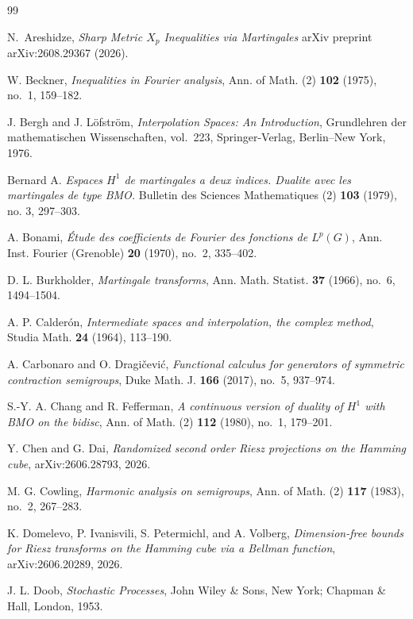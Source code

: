 \documentclass{amsart}
\numberwithin{equation}{section}
\theoremstyle{definition}
\theoremstyle{remark}
\newcommand{\1}{\mathbf 1}
\begin{document}
\begin{thebibliography}{99}

N.~Areshidze, \emph{Sharp Metric $ X_p $ Inequalities via Martingales} arXiv preprint arXiv:2608.29367 (2026).

W. Beckner,
\emph{Inequalities in Fourier analysis},
Ann. of Math. (2) \textbf{102} (1975), no.~1, 159--182.

J. Bergh and J. L\"ofstr\"om,
\emph{Interpolation Spaces: An Introduction},
Grundlehren der mathematischen Wissenschaften, vol.~223,
Springer-Verlag, Berlin--New York, 1976.

 Bernard A. {\it Espaces $H^1$ de martingales a deux indices. Dualite avec les martingales de type BMO.} Bulletin des Sciences Mathematiques (2) {\bf 103} (1979), no. 3, 297--303.

A. Bonami,
\emph{\'Etude des coefficients de Fourier des fonctions de $L^{p}(G)$},
Ann. Inst. Fourier (Grenoble) \textbf{20} (1970), no.~2, 335--402.


D. L. Burkholder,
\emph{Martingale transforms},
Ann. Math. Statist. \textbf{37} (1966), no.~6, 1494--1504.

A. P. Calder\'on,
\emph{Intermediate spaces and interpolation, the complex method},
Studia Math. \textbf{24} (1964), 113--190.

A. Carbonaro and O. Dragi\v{c}evi\'c,
\emph{Functional calculus for generators of symmetric contraction
semigroups},
Duke Math. J. \textbf{166} (2017), no.~5, 937--974.

S.-Y. A. Chang and R. Fefferman,
\emph{A continuous version of duality of $H^{1}$ with BMO on the bidisc},
Ann. of Math. (2) \textbf{112} (1980), no.~1, 179--201.

Y. Chen and G. Dai,
\emph{Randomized second order Riesz projections on the Hamming cube},
arXiv:2606.28793, 2026.

M. G. Cowling,
\emph{Harmonic analysis on semigroups},
Ann. of Math. (2) \textbf{117} (1983), no.~2, 267--283.

K. Domelevo, P. Ivanisvili, S. Petermichl, and A. Volberg,
\emph{Dimension-free bounds for Riesz transforms on the Hamming cube via a Bellman function},
arXiv:2606.20289, 2026.

J. L. Doob,
\emph{Stochastic Processes},
John Wiley \& Sons, New York; Chapman \& Hall, London, 1953.


\end{thebibliography}
\end{document}
